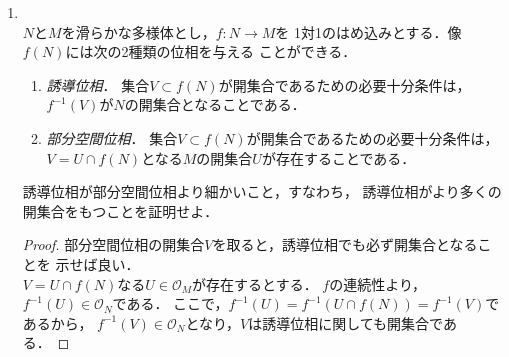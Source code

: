 \documentclass[dvipdfmx,a4paper,11pt]{jsarticle}
\begin{document}
\begin{enumerate}
\begin{enumerate}
\begin{proof}
      $(i,j)\neq(k,l)$なる$a_{ij}$たちが座標系をなす
      SL$(n,\mathbb{R})$のチャートである．
      さらに，陰関数定理より$U'\subseteq
      U\cap\text{SL}(n,\mathbb{R})$なる$A$の近傍$U'$において
      \begin{align}
        g(a_{11},\dots,a_{nn})=0
        \iff
        a_{kl}=h(\{a_{ij}\}_{(i,j)\neq(k,l)})
      \end{align}
      となる$C^\infty$級関数$h$が存在する．
      この$U'$が求める近傍である．
    \end{proof}
    \item 乗法写像
    \begin{align}
      \overline\mu\colon \text{SL}(n,\mathbb{R})\times
       \text{SL}(n,\mathbb{R})\to \text{SL}(n,\mathbb{R})
    \end{align}
    は$C^\infty$級である．
    \begin{proof}
      (a)のチャート及び関数$h$を取ると，成分ごとに$C^\infty$
      級関数であることが明らか．\\
      丁寧に述べれば，$\overline\mu$は
      $j\colon\text{SL}(n,\mathbb{R})\to\text{GL}(n,\mathbb{R})$と
      $\mu\colon \text{GL}(n,\mathbb{R})\times
      \text{GL}(n,\mathbb{R})\to \text{GL}(n,\mathbb{R})$とを用いて
      \begin{align}
        \overline\mu=j^{-1}\circ\mu\circ(j\times j)
      \end{align}
      と書けて，$j$,$j^{-1}$が$C^\infty$級であることが(a)より従い，
      $\mu$も$C^\infty$級であるから，合成も$C^\infty$級であると言える．
    \end{proof}
  \end{enumerate}
  \item{}\\
  $N$と$M$を滑らかな多様体とし，$f\colon N\to M$を
  1対1のはめ込みとする．像$f(N)$には次の2種類の位相を与える
  ことができる．
  \begin{enumerate}
    \item \emph{誘導位相}．
    集合$V\subset f(N)$が開集合であるための必要十分条件は，
    $f^{-1}(V)$が$N$の開集合となることである．
    \item \emph{部分空間位相}．
    集合$V\subset f(N)$が開集合であるための必要十分条件は，
    $V=U\cap f(N)$となる$M$の開集合$U$が存在することである．
  \end{enumerate}
  誘導位相が部分空間位相より細かいこと，すなわち，
  誘導位相がより多くの開集合をもつことを証明せよ．
  \begin{proof}
    部分空間位相の開集合$V$を取ると，誘導位相でも必ず開集合となることを
    示せば良い．\\
    $V=U\cap f(N)$なる$U\in\mathcal{O}_M$が存在するとする．
    $f$の連続性より，$f^{-1}(U)\in\mathcal{O}_N$である．
    ここで，$f^{-1}(U)=f^{-1}(U\cap f(N))=f^{-1}(V)$であるから，
    $f^{-1}(V)\in\mathcal{O}_N$となり，$V$は誘導位相に関しても開集合である．
  \end{proof}
\end{enumerate}
\end{document}
